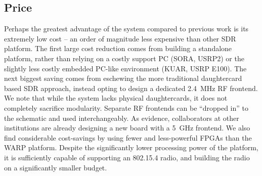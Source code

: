 \subsection{Price}
Perhaps the greatest advantage of the \sdr system compared to previous
work is its extremely low cost -- an order of magnitude less expensive
than other SDR platform. The first large cost reduction comes from
building a standalone platform, rather than relying on a costly
support PC (SORA, USRP2) or the slightly less costly embedded PC-like
environment (KUAR, USRP E100). The next biggest saving comes from
eschewing the more traditional daughtercard based SDR approach,
instead opting to design a dedicated 2.4~MHz RF frontend. We note that
while the \sdr system lacks physical daughtercards, it does not
completely sacrifice modularity. Separate RF frontends can be
``dropped in'' to the schematic and used interchangeably. As evidence,
collaborators at other institutions
are already designing a new board with a 5~GHz frontend. We also find
considerable cost-savings by using fewer and less-powerful FPGAs than
the WARP platform. Despite the significantly lower processing power of
the \sdr platform, it is sufficiently capable of supporting an
802.15.4 radio, and building the radio on a significantly smaller
budget.

\begin{comment}
\subsection{Deployability}
Ultimately, \sdr contributes what we argue to be the first truly
{\em deployable} SDR platform. Previous platforms were tied to PCs
(SORA, USRP 2), tied to large power supplies (KUAR, WARP, USRP E100),
or existed only as simulations (SODA). Even resolving these issues,
all prior platforms were prohibitively expensive for any large scale
deployment. We estimate the cost per node of a 1,000 node \sdr
deployment to be only $\$150$, a full order of magnitude better than
the previous state of the art.
\end{comment}


